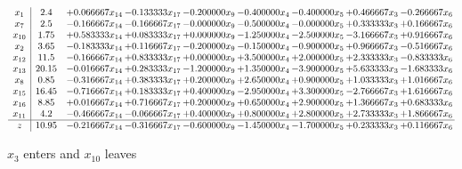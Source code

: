 \documentclass[10pt]{article}
\begin{document}
 \[\begin{array}{c| c c@{\hskip 2pt} c@{\hskip 2pt} c@{\hskip 2pt} c@{\hskip 2pt} c@{\hskip 2pt} c@{\hskip 2pt} c@{\hskip 2pt} }
 x_{1}   &  2.4 & + 0.066667 x_{14} & -0.133333 x_{17} & -0.200000 x_{9} & -0.400000 x_{4} & -0.400000 x_{5} & + 0.466667 x_{3} & -0.266667 x_{6}\\
 x_{7}   &  2.5 & -0.166667 x_{14} & -0.166667 x_{17} & -0.000000 x_{9} & -0.500000 x_{4} & -0.000000 x_{5} & + 0.333333 x_{3} & + 0.166667 x_{6}\\
 x_{10}   &  1.75 & + 0.583333 x_{14} & + 0.083333 x_{17} & + 0.000000 x_{9} & -1.250000 x_{4} & -2.500000 x_{5} & -3.166667 x_{3} & + 0.916667 x_{6}\\
 x_{2}   &  3.65 & -0.183333 x_{14} & + 0.116667 x_{17} & -0.200000 x_{9} & -0.150000 x_{4} & -0.900000 x_{5} & + 0.966667 x_{3} & -0.516667 x_{6}\\
 x_{12}   &  11.5 & -0.166667 x_{14} & + 0.833333 x_{17} & + 0.000000 x_{9} & + 3.500000 x_{4} & + 2.000000 x_{5} & + 2.333333 x_{3} & -0.833333 x_{6}\\
 x_{13}   &  20.15 & -0.016667 x_{14} & + 0.283333 x_{17} & -1.200000 x_{9} & + 1.350000 x_{4} & -3.900000 x_{5} & + 5.633333 x_{3} & -1.683333 x_{6}\\
 x_{8}   &  0.85 & -0.316667 x_{14} & + 0.383333 x_{17} & + 0.200000 x_{9} & + 2.650000 x_{4} & + 0.900000 x_{5} & + 1.033333 x_{3} & + 1.016667 x_{6}\\
 x_{15}   &  16.45 & -0.716667 x_{14} & + 0.183333 x_{17} & + 0.400000 x_{9} & -2.950000 x_{4} & + 3.300000 x_{5} & -2.766667 x_{3} & + 1.616667 x_{6}\\
 x_{16}   &  8.85 & + 0.016667 x_{14} & + 0.716667 x_{17} & + 0.200000 x_{9} & + 0.650000 x_{4} & + 2.900000 x_{5} & + 1.366667 x_{3} & + 0.683333 x_{6}\\
 x_{11}   &  4.2 & -0.466667 x_{14} & -0.066667 x_{17} & + 0.400000 x_{9} & + 0.800000 x_{4} & + 2.800000 x_{5} & + 2.733333 x_{3} & + 1.866667 x_{6}\\
\hline
z    &  10.95 & -0.216667 x_{14} & -0.316667 x_{17} & -0.600000 x_{9} & -1.450000 x_{4} & -1.700000 x_{5} & + 0.233333 x_{3} & + 0.116667 x_{6}\\
\end{array}\]


 $ x_{3} $ enters and $ x_{10} $ leaves 
\end{document}
